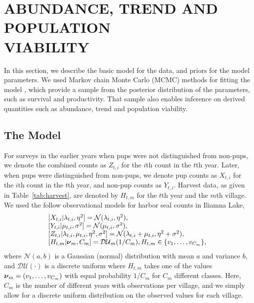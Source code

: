 \documentclass[12pt, titlepage]{article}\usepackage[]{graphicx}\usepackage[]{color}
\def\bnu{\mbox{\boldmath $\nu$}}
\begin{document}

\section{ABUNDANCE, TREND AND POPULATION \\ VIABILITY}

In this section, we describe the basic model for the data, and priors for the model parameters.  We used Markov chain Monte Carlo (MCMC) methods for fitting the model \citep[e.g.,][]{Gilk:Rich:Spie:intr:1996}, which provide a sample from the posterior distribution of the parameters, such as survival and productivity.  That sample also enables inference on derived quantities such as abundance, trend and population viability.

\subsection{The Model} \label{sec:model}

For surveys in the earlier years when pups were not distinguished from non-pups, we denote the combined counts as $Z_{t,i}$ for the $i$th count in the $t$th year.  Later, when pups were distinguished from non-pups, we denote pup counts as $X_{t,i}$ for the $i$th count in the $t$th year, and non-pup counts as $Y_{t,i}$. Harvest data, as given in  Table~\ref{tab:harvest}, are denoted by $H_{t,m}$ for the $t$th year and the $m$th village. We used the follow observational models for harbor seal counts in Iliamna Lake,
%
\begin{equation} \label{eq:modelSetup}
  \begin{tabular}{l}
    $[X_{t,i}|\lambda_{t,i},\eta^2] = \mathcal{N}(\lambda_{t,i}, \eta^2)$, \\
    $[Y_{t,i}|\mu_{t,i},\sigma^2] = \mathcal{N}(\mu_{t,i}, \sigma^2)$, \\
    $[Z_{t,i}|\lambda_{t,i},\mu_{t,i},\eta^2,\sigma^2] = \mathcal{N}(\lambda_{t,i} + \mu_{t,i}, \eta^2 + \sigma^2),$ \\
    $[H_{t,m}|\bnu_m,C_m] = \mathcal{DU}_m(1/C_m), H_{t,m} \in \{v_1,\ldots,v_{C_m}\}$,
  \end{tabular}
\end{equation}
where $\mathcal{N}(a,b)$ is a Gaussian (normal) distribution with mean $a$ and variance $b$, and $\mathcal{DU}(\cdot)$ is a discrete uniform where $H_{t,m}$ takes one of the values $\bnu_m = (v_1,\ldots,v_{C_m})$ with equal probability $1/C_m$ for $C_m$ different classes.  Here, $C_m$ is the number of different years with observations per village, and we simply allow for a discrete uniform distribution on the observed values for each village.
\end{document}
